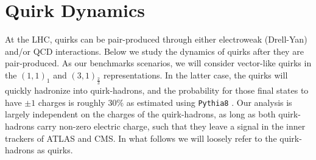 \documentclass[10pt,aps,prd,nofootinbib,superscriptaddress,twocolumn,preprintnumbers,balancelastpage]{revtex4}
\begin{document}
\section{Quirk Dynamics}
\label{sec:dynamics}
At the LHC, quirks can be pair-produced through either electroweak (Drell-Yan) and/or QCD interactions. Below we study the dynamics of quirks after they are pair-produced. As our benchmarks scenarios, we will consider vector-like quirks in the $(1,1)_1$ and $(3,1)_{\frac{2}{3}}$ representations. In the latter case, the quirks will quickly hadronize into quirk-hadrons, and the probability for those final states to have $\pm 1$ charges is roughly 30\% as estimated using \texttt{Pythia8} \cite{Sjostrand:2014zea}. Our analysis is largely independent on the charges of the quirk-hadrons, as long as both quirk-hadrons carry non-zero electric charge, such that they leave a signal in the inner trackers of ATLAS and CMS. In what follows we will loosely refer to the quirk-hadrons as quirks.  

 
\end{document}
